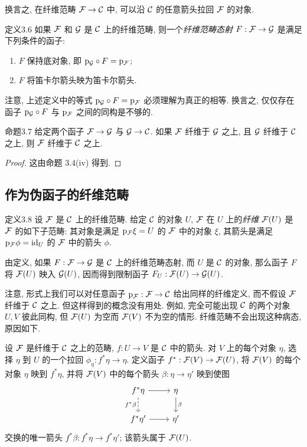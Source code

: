 换言之, 在纤维范畴 $\mathcal F\to\mathcal C$ 中, 可以沿 $\mathcal C$ 的任意箭头拉回 $\mathcal F$ 的对象.

\begin{origstatement}{定义}{3.6}\label{ch03:def36}
如果 $\mathcal F$ 和 $\mathcal G$ 是 $\mathcal C$ 上的纤维范畴, 则一个\emph{纤维范畴态射} $F:\mathcal F\to\mathcal G$ 是满足下列条件的函子:
\begin{enumerate}
\item[(i)] $F$ 保持底对象, 即 $\mathrm p_{\mathcal G}\circ F=\mathrm p_{\mathcal F}$;
\item[(ii)] $F$ 将笛卡尔箭头映为笛卡尔箭头.
\end{enumerate}
\end{origstatement}

注意, 上述定义中的等式 $\mathrm p_{\mathcal G}\circ F=\mathrm p_{\mathcal F}$ 必须理解为真正的相等. 换言之, 仅仅存在函子 $\mathrm p_{\mathcal G}\circ F$ 与 $\mathrm p_{\mathcal F}$ 之间的同构是不够的.

\begin{origstatement}{命题}{3.7}\label{ch03:prop37}
给定两个函子 $\mathcal F\to\mathcal G$ 与 $\mathcal G\to\mathcal C$. 如果 $\mathcal F$ 纤维于 $\mathcal G$ 之上, 且 $\mathcal G$ 纤维于 $\mathcal C$ 之上, 则 $\mathcal F$ 纤维于 $\mathcal C$ 之上.
\end{origstatement}
\begin{proof}
这由命题 3.4(iv) 得到.
\end{proof}

\subsection{作为伪函子的纤维范畴}
\begin{origstatement}{定义}{3.8}\label{ch03:def38}
设 $\mathcal F$ 是 $\mathcal C$ 上的纤维范畴. 给定 $\mathcal C$ 的对象 $U$, $\mathcal F$ 在 $U$ 上的\emph{纤维} $\mathcal F(U)$ 是 $\mathcal F$ 的如下子范畴: 其对象是满足 $\mathrm p_{\mathcal F}\xi=U$ 的 $\mathcal F$ 中的对象 $\xi$, 其箭头是满足 $\mathrm p_{\mathcal F}\phi=\mathrm{id}_U$ 的 $\mathcal F$ 中的箭头 $\phi$.
\end{origstatement}

由定义, 如果 $F:\mathcal F\to\mathcal G$ 是 $\mathcal C$ 上的纤维范畴态射, 而 $U$ 是 $\mathcal C$ 的对象, 那么函子 $F$ 将 $\mathcal F(U)$ 映入 $\mathcal G(U)$, 因而得到限制函子 $F_U:\mathcal F(U)\to\mathcal G(U)$.

注意, 形式上我们可以对任意函子 $\mathrm p_{\mathcal F}:\mathcal F\to\mathcal C$ 给出同样的纤维定义, 而不假设 $\mathcal F$ 纤维于 $\mathcal C$ 之上. 但这样得到的概念没有用处. 例如, 完全可能出现 $\mathcal C$ 的两个对象 $U,V$ 彼此同构, 但 $\mathcal F(U)$ 为空而 $\mathcal F(V)$ 不为空的情形. 纤维范畴不会出现这种病态, 原因如下.

设 $\mathcal F$ 是纤维于 $\mathcal C$ 之上的范畴, $f:U\to V$ 是 $\mathcal C$ 中的箭头. 对 $V$ 上的每个对象 $\eta$, 选择 $\eta$ 到 $U$ 的一个拉回 $\phi_\eta:f^*\eta\to\eta$. 定义函子 $f^*:\mathcal F(V)\to\mathcal F(U)$, 将 $\mathcal F(V)$ 的每个对象 $\eta$ 映到 $f^*\eta$, 并将 $\mathcal F(V)$ 中的每个箭头 $\beta:\eta\to\eta'$ 映到使图
\[
\begin{tikzcd}
f^*\eta\arrow[r]\arrow[d,dashed,"{f^*\beta}"']&\eta\arrow[d,"{\beta}"]\\
f^*\eta'\arrow[r]&\eta'
\end{tikzcd}
\]
交换的唯一箭头 $f^*\beta:f^*\eta\to f^*\eta'$; 该箭头属于 $\mathcal F(U)$.

